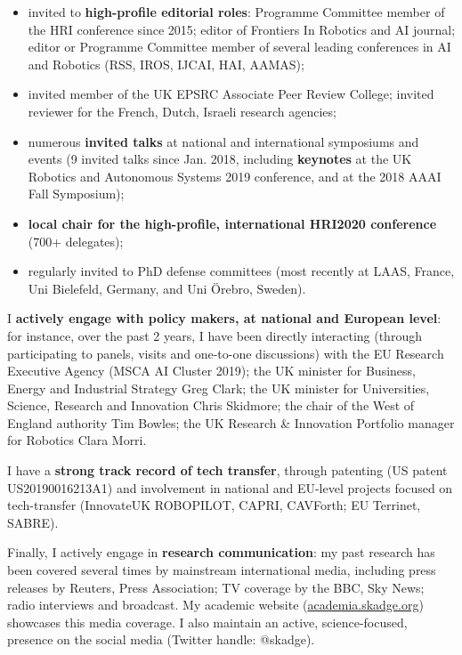 \begin{itemize}[noitemsep,topsep=0pt,parsep=0pt,partopsep=0pt]
    \item invited to \textbf{high-profile editorial roles}: Programme Committee member of the HRI
conference since 2015; editor of Frontiers In Robotics and AI journal; editor or
Programme Committee member of several leading conferences in AI and Robotics
        (RSS, IROS, IJCAI, HAI, AAMAS);
    \item invited member of the UK EPSRC Associate Peer Review College;
        invited reviewer for the French, Dutch, Israeli research agencies;
    \item numerous \textbf{invited talks} at national and international symposiums and
        events (9 invited talks since Jan. 2018, including \textbf{keynotes} at the UK Robotics
and Autonomous Systems 2019 conference, and at the 2018 AAAI Fall Symposium);
    \item \textbf{local chair for the high-profile, international HRI2020
        conference} (700+ delegates);
    \item regularly invited to PhD defense committees (most recently at
        LAAS, France, Uni Bielefeld, Germany, and Uni Örebro, Sweden).
\end{itemize}


\vspace{1em} 

I \textbf{actively engage with policy makers, at national and European
level}: for instance, over the past 2 years, I have been directly interacting
(through participating to panels, visits and one-to-one discussions) with the EU
Research Executive Agency (MSCA AI Cluster 2019); the UK minister for Business,
Energy and Industrial Strategy Greg Clark; the UK minister for Universities,
Science, Research and Innovation Chris Skidmore; the chair of the West of
England authority Tim Bowles; the UK Research \& Innovation Portfolio
manager for Robotics Clara Morri.

I have a \textbf{strong track record of tech transfer}, through patenting (US patent
US20190016213A1) and involvement in national and EU-level projects focused on
tech-transfer (InnovateUK ROBOPILOT, CAPRI, CAVForth; EU Terrinet, SABRE).

Finally, I actively engage in \textbf{research communication}: my past research has been
covered several times by mainstream international media, including press
releases by Reuters, Press Association; TV coverage by the BBC, Sky News; radio
interviews and broadcast. My academic website (\url{academia.skadge.org})
showcases this media coverage. I also maintain an active, science-focused,
presence on the social media (Twitter handle: @skadge).







